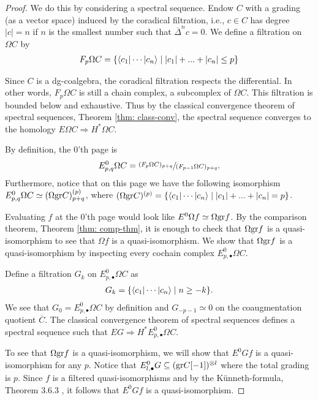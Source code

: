 \documentclass[../thesis.tex]{subfiles}
\begin{document}
            \begin{proof}
                We do this by considering a spectral sequence. Endow $C$ with a grading (as a vector space) induced by the coradical filtration, i.e., $c\in C$ has degree $|c|=n$ if $n$ is the smallest number such that $\overline{\Delta}^nc = 0$. We define a filtration on $\Omega C$ by
                \begin{align*}
                    F_p\Omega C = \startset{\langle c_1 | \cdots | c_n \rangle \mid |c_1|+...+|c_n|\leq p}
                \end{align*}

                Since $C$ is a dg-coalgebra, the coradical filtration respects the differential. In other words, $F_p\Omega C$ is still a chain complex, a subcomplex of $\Omega C$. This filtration is bounded below and exhaustive. Thus by the classical convergence theorem of spectral sequences, Theorem \ref{thm: class-conv}, the spectral sequence converges to the homology $E\Omega C \Rightarrow H^*\Omega C$.

                By definition, the $0$'th page is 
                \begin{align*}
                    E^0_{p,q}\Omega C = \sfrac{(F_p\Omega C)_{p+q}}{(F_{p-1}\Omega C)_{p+q}}\tt{.}
                \end{align*}
                Furthermore, notice that on this page we have the following isomorphism $E^0_{p,q}\Omega C \simeq (\Omega \tt{gr}C)^{(p)}_{p+q}$, where $(\Omega \tt{gr}C)^{(p)} = \startset{\langle c_1 | \cdots | c_n \rangle \mid |c_1|+...+|c_n| = p}$.

                Evaluating $f$ at the $0$'th page would look like $E^0\Omega f \simeq \Omega \tt{gr}f$. By the comparison theorem, Theorem \ref{thm: comp-thm}, it is enough to check that $\Omega \tt{gr}f$ is a quasi-isomorphism to see that $\Omega f$ is a quasi-isomorphism. We show that $\Omega \tt{gr}f$ is a quasi-isomorphism by inspecting every cochain complex $E^0_{p,\bullet}\Omega C$.

                Define a filtration $G_k$ on $E^0_{p,\bullet}\Omega C$ as
                \begin{align*}
                    G_k = \startset{\langle c_1 | \cdots | c_n \rangle \mid n \geq -k}.
                \end{align*}
                We see that $G_0 = E^0_{p, \bullet}\Omega C$ by definition and $G_{-p-1} \simeq 0$ on the coaugmentation quotient $\overline{C}$. The classical convergence theorem of spectral sequences defines a spectral sequence such that $EG \Rightarrow H^*E^0_{p, \bullet}\Omega C$.

                To see that $\Omega \tt{gr}f$ is a quasi-isomorphism, we will show that $E^0Gf$ is a quasi-isomorphism for any $p$. Notice that $E^0_{l,\bullet}G \subseteq (\tt{gr}C[-1])^{\otimes l}$ where the total grading is $p$. Since $f$ is a filtered quasi-isomorphisms and by the K\"unneth-formula, Theorem 3.6.3 \cite[Theorem 3.6.3][88]{Weibel94}, it follows that $E^0Gf$ is a quasi-isomorphism.
            \end{proof}
\end{document}
